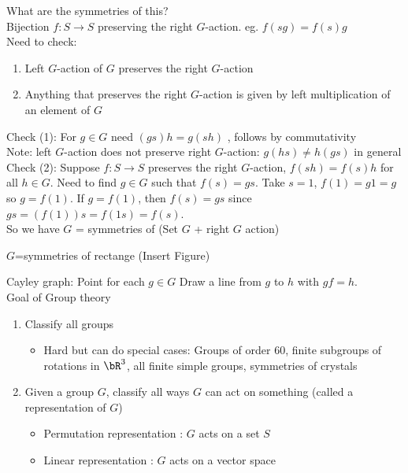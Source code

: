 \noindent
What are the symmetries of this? \\
Bijection $f : S \to S$ preserving the right $G$-action. eg. $f(sg) = f(s)g$ \\
Need to check: 
\begin{enumerate}
    \item Left $G$-action of $G$ preserves the right $G$-action 
    \item Anything that preserves the right $G$-action is given by left multiplication of an element of $G$
\end{enumerate} 

\noindent
Check (1): For $g \in G$ need $(gs)h = g(sh)$ , follows by commutativity \\
Note: left $G$-action does not preserve right $G$-action: $g(hs) \neq h(gs)$ in general \\

\noindent
Check (2): Suppose $f: S \to S$ preserves the right $G$-action, $f(sh) = f(s)h$ for all $h \in G$. Need to find $g \in G$ such that $f(s) = gs$. Take $s=1$, $f(1)=g1=g$ so $g=f(1)$. If $g = f(1)$, then $f(s)=gs$ since $gs = (f(1))s = f(1s) = f(s)$. \\
So we have $G$ = symmetries of (Set $G$ + right $G$ action) 

\begin{example}
    $G$=symmetries of rectange (Insert Figure)
\end{example}

\noindent
Cayley graph: Point for each $g \in G$ Draw a line from $g$ to $h$ with $gf=h$. \\

\noindent
Goal of Group theory
\begin{enumerate}
    \item Classify all groups 
    \begin{itemize}
        \item Hard but can do special cases: Groups of order 60, finite subgroups of rotations in $\bR^3$, all finite simple groups, symmetries of crystals 
    \end{itemize}
    \item Given a group $G$, classify all ways $G$ can act on something (called a representation of $G$)
    \begin{itemize}
        \item Permutation representation : $G$ acts on a set $S$
        \item Linear representation : $G$ acts on a vector space 
    \end{itemize}
\end{enumerate}

